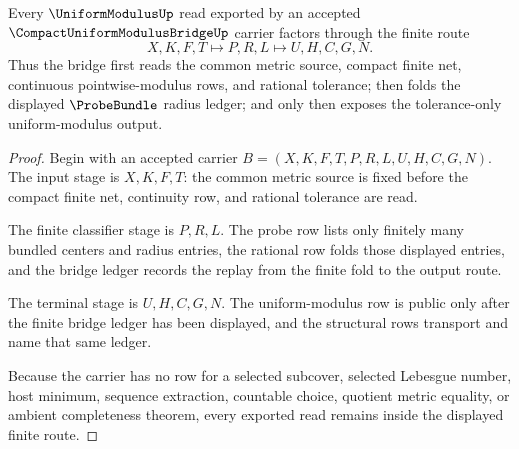\begin{theorem}
\label{thm:compact-uniform-modulus-finite-probebundle-bridge}
Every $\UniformModulusUp$ read exported by an accepted $\CompactUniformModulusBridgeUp$ carrier factors through the finite route
$$
X,K,F,T \longmapsto P,R,L \longmapsto U,H,C,G,N .
$$
Thus the bridge first reads the common metric source, compact finite net, continuous pointwise-modulus rows, and rational tolerance; then folds the displayed $\ProbeBundle$ radius ledger; and only then exposes the tolerance-only uniform-modulus output.
\end{theorem}
\begin{proof}
Begin with an accepted carrier $B=(X,K,F,T,P,R,L,U,H,C,G,N)$. The input stage is $X,K,F,T$: the common metric source is fixed before the compact finite net, continuity row, and rational tolerance are read.

The finite classifier stage is $P,R,L$. The probe row lists only finitely many bundled centers and radius entries, the rational row folds those displayed entries, and the bridge ledger records the replay from the finite fold to the output route.

The terminal stage is $U,H,C,G,N$. The uniform-modulus row is public only after the finite bridge ledger has been displayed, and the structural rows transport and name that same ledger.

Because the carrier has no row for a selected subcover, selected Lebesgue number, host minimum, sequence extraction, countable choice, quotient metric equality, or ambient completeness theorem, every exported read remains inside the displayed finite route.
\end{proof}


